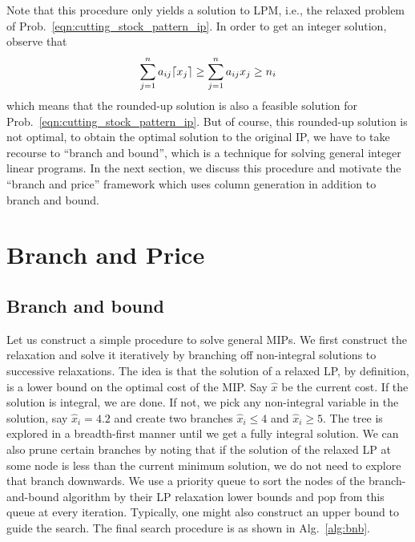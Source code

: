 \documentclass[letterpaper, 10pt, twocolumn, reqno]{amsart}
\begin{document}
Note that this procedure only yields a solution to LPM, i.e., the relaxed problem of Prob.~\eqref{eqn:cutting_stock_pattern_ip}. In order to get an integer solution, observe that
$$
\sum_{j=1}^n a_{ij} \lceil x_j\rceil \geq \sum_{j=1}^n a_{ij} x_j \geq n_i
$$
which means that the rounded-up solution is also a feasible solution for Prob.~\eqref{eqn:cutting_stock_pattern_ip}. But of course, this rounded-up solution is not optimal, to obtain the optimal solution to the original IP, we have to take recourse to ``branch and bound'', which is a technique for solving general integer linear programs. In the next section, we discuss this procedure and motivate the ``branch and price'' framework which uses column generation in addition to branch and bound.

\section{Branch and Price}
\label{sec:branch_and_price}

\subsection{Branch and bound}
\label{ssec:branch_and_bound}

Let us construct a simple procedure to solve general MIPs. We first construct
the relaxation and solve it iteratively by branching off non-integral solutions to successive relaxations. The idea is that the solution of a
relaxed LP, by definition, is a lower bound on the optimal cost of the MIP. Say $\hat{x}$ be the current cost. If the solution is integral, we are done. If not, we pick any non-integral variable in the solution, say $\hat{x}_i = 4.2$ and create two branches $\hat{x}_i \leq 4$ and $\hat{x}_i \geq 5$. The tree
is explored in a breadth-first manner until we get a fully integral solution. We can also prune certain branches by noting that if the solution of the
relaxed LP at some node is less than the current minimum solution, we do not need to explore that branch downwards. We use a priority queue to sort the nodes of the branch-and-bound algorithm by their LP relaxation lower bounds and pop from this queue at every iteration. Typically, one might also construct an upper bound to guide the search. The final search procedure is as shown in Alg.~\ref{alg:bnb}.
\end{document}
